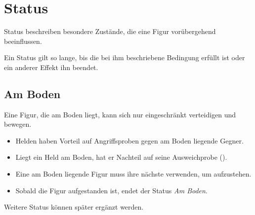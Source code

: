 \chapter{Status}

Status beschreiben besondere Zustände, die eine Figur vorübergehend beeinflussen.

Ein Status gilt so lange, bis die bei ihm beschriebene Bedingung erfüllt ist oder ein anderer Effekt ihn beendet.

\section{Am Boden}

Eine Figur, die am Boden liegt, kann sich nur eingeschränkt verteidigen und bewegen.

\begin{itemize}
  \item Helden haben Vorteil auf Angriffsproben gegen am Boden liegende Gegner.
  \item Liegt ein Held am Boden, hat er Nachteil auf seine Ausweichprobe (\evade).
  \item Eine am Boden liegende Figur muss ihre nächste \moveAction{} verwenden, um aufzustehen.
  \item Sobald die Figur aufgestanden ist, endet der Status \emph{Am Boden}.
\end{itemize}

Weitere Status können später ergänzt werden.